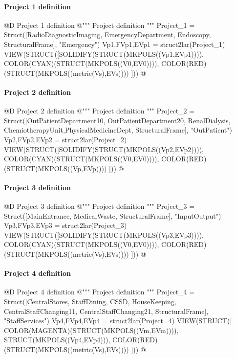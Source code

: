 \documentclass[11pt,oneside]{article}    %
\begin{document}
\paragraph{Project 1 definition}
@D Project 1 definition
@{""" Project definition """
Project_1 = Struct([RadioDiagnosticImaging, EmergencyDepartment, Endoscopy, 
					StructuralFrame], "Emergency")
Vp1,FVp1,EVp1 = struct2lar(Project_1)
VIEW(STRUCT([SOLIDIFY(STRUCT(MKPOLS((Vp1,EVp1)))), COLOR(CYAN)(STRUCT(MKPOLS((V0,EV0)))),
COLOR(RED)(STRUCT(MKPOLS((metric(Vs),EVs)))) ]))
@}

\paragraph{Project 2 definition}
@D Project 2 definition
@{""" Project definition """
Project_2 = Struct([OutPatientDepartment10, OutPatientDepartment20, RenalDialysis,
					ChemiotherapyUnit,PhysicalMedicineDept, StructuralFrame], "OutPatient")
Vp2,FVp2,EVp2 = struct2lar(Project_2)
VIEW(STRUCT([SOLIDIFY(STRUCT(MKPOLS((Vp2,EVp2)))), COLOR(CYAN)(STRUCT(MKPOLS((V0,EV0)))),
COLOR(RED)(STRUCT(MKPOLS((Vp,EVp)))) ]))
@}

\paragraph{Project 3 definition}
@D Project 3 definition
@{""" Project definition """
Project_3 = Struct([MainEntrance, MedicalWaste, StructuralFrame], "InputOutput")
Vp3,FVp3,EVp3 = struct2lar(Project_3)
VIEW(STRUCT([SOLIDIFY(STRUCT(MKPOLS((Vp3,EVp3)))), COLOR(CYAN)(STRUCT(MKPOLS((V0,EV0)))),
COLOR(RED)(STRUCT(MKPOLS((metric(Vs),EVs)))) ]))
@}

\paragraph{Project 4 definition}
@D Project 4 definition
@{""" Project definition """
Project_4 = Struct([CentralStores, StaffDining, CSSD, HouseKeeping,  
		CentralStaffChanging11, CentralStaffChanging21, StructuralFrame], "StaffServices")
Vp4,FVp4,EVp4 = struct2lar(Project_4)
VIEW(STRUCT([ COLOR(MAGENTA)(STRUCT(MKPOLS((Vm,EVm)))), STRUCT(MKPOLS((Vp4,EVp4))),
COLOR(RED)(STRUCT(MKPOLS((metric(Vs),EVs)))) ]))
@}
\end{document}
